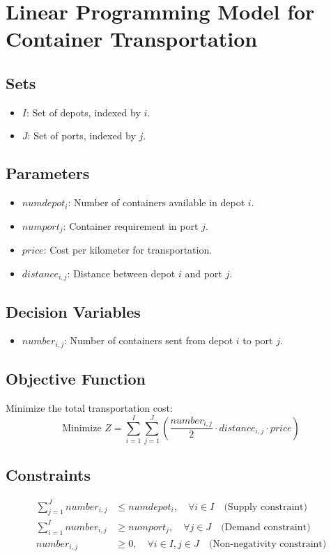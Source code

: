 \documentclass{article}
\begin{document}
\section*{Linear Programming Model for Container Transportation}

\subsection*{Sets}
\begin{itemize}
    \item $I$: Set of depots, indexed by $i$.
    \item $J$: Set of ports, indexed by $j$.
\end{itemize}

\subsection*{Parameters}
\begin{itemize}
    \item $numdepot_i$: Number of containers available in depot $i$.
    \item $numport_j$: Container requirement in port $j$.
    \item $price$: Cost per kilometer for transportation.
    \item $distance_{i,j}$: Distance between depot $i$ and port $j$.
\end{itemize}

\subsection*{Decision Variables}
\begin{itemize}
    \item $number_{i,j}$: Number of containers sent from depot $i$ to port $j$.
\end{itemize}

\subsection*{Objective Function}
Minimize the total transportation cost:
\[
\text{Minimize } Z = \sum_{i=1}^{I} \sum_{j=1}^{J} \left( \frac{number_{i,j}}{2} \cdot distance_{i,j} \cdot price \right)
\]

\subsection*{Constraints}
\begin{align}
    \sum_{j=1}^{J} number_{i,j} & \leq numdepot_i, \quad \forall i \in I \quad \text{(Supply constraint)} \\
    \sum_{i=1}^{I} number_{i,j} & \geq numport_j, \quad \forall j \in J \quad \text{(Demand constraint)} \\
    number_{i,j} & \geq 0, \quad \forall i \in I, j \in J \quad \text{(Non-negativity constraint)}
\end{align}
\end{document}
